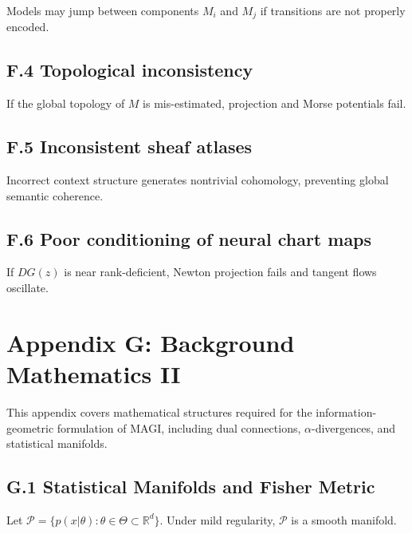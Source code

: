\documentclass[11pt,a4paper,twocolumn]{article}
\begin{document}
Models may jump between components $M_i$ and $M_j$ if transitions are not properly encoded.

\subsection*{F.4 Topological inconsistency}

If the global topology of $M$ is mis-estimated, projection and Morse potentials fail.

\subsection*{F.5 Inconsistent sheaf atlases}

Incorrect context structure generates nontrivial cohomology, preventing global semantic coherence.

\subsection*{F.6 Poor conditioning of neural chart maps}

If $DG(z)$ is near rank-deficient, Newton projection fails and tangent flows oscillate.


\section*{Appendix G: Background Mathematics II}

This appendix covers mathematical structures required for the
information-geometric formulation of MAGI, including dual connections,
$\alpha$-divergences, and statistical manifolds.


\subsection*{G.1 Statistical Manifolds and Fisher Metric}

Let $\mathcal{P} = \{ p(x|\theta) : \theta \in \Theta \subset \mathbb{R}^d \}$.
Under mild regularity, $\mathcal{P}$ is a smooth manifold.
\end{document}
